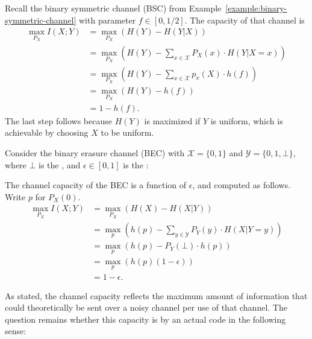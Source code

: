 \begin{example}
Recall the binary symmetric channel (BSC) from Example~\ref{example:binary-symmetric-channel} with parameter $f \in [0,1/2]$. The capacity of that channel is
\begin{align*}
\max_{P_X} I(X;Y) &= \max_{P_X} \left( H(Y) - H(Y|X)\right)\\
&= \max_{P_X} \left( H(Y) - \sum_{x \in \mathcal{X}} P_X(x) \cdot H(Y|X=x)\right)\\
&= \max_{P_X} \left( H(Y) - \sum_{x \in \mathcal{X}} p_x(X) \cdot h(f)\right)\\
&= \max_{P_X} \left( H(Y) - h(f)\right)\\
&= 1- h(f).
\end{align*}
The last step follows because $H(Y)$ is maximized if $Y$ is uniform, which is achievable by choosing $X$ to be uniform.
\end{example}

\begin{example}
Consider the binary erasure channel (BEC) with $\mathcal{X} = \{0,1\}$ and $\mathcal{Y} = \{0,1,\bot\}$, where $\bot$ is the , and $\epsilon \in [0,1]$ is the :
\begin{center}
\end{center} 
The channel capacity of the BEC is a function of $\epsilon$, and computed as follows. Write $p$ for $P_X(0)$.
\begin{align*}
\max_{P_X} I(X;Y) &= \max_{P_X} \left( H(X) - H(X|Y)\right)\\
&= \max_{p} \left( h(p) - \sum_{y \in \mathcal{Y}} P_Y(y) \cdot H(X|Y=y)\right)\\
&= \max_{p} \left( h(p) - P_Y(\bot) \cdot h(p)\right)\\
&= \max_{p} \left( h(p) (1-\epsilon)\right)\\
&= 1 - \epsilon.
\end{align*}
\end{example}
As stated, the channel capacity reflects the maximum amount of information that could theoretically be sent over a noisy channel per use of that channel. The question remains whether this capacity is  by an actual code in the following sense:

